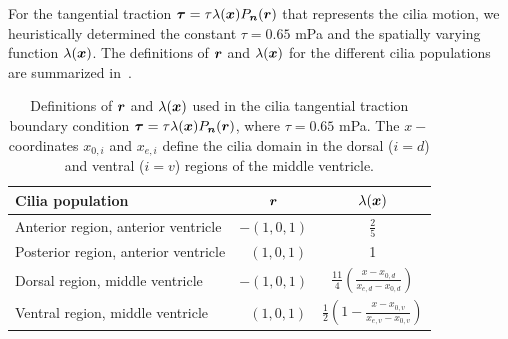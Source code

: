 \documentclass{WileyMSP-template}
\begin{document}
For the tangential traction $\bm{\tau} = \tau\lambda(\bm{x}) P_{\bm{n}}(\bm{r})$ that represents the cilia
motion, we heuristically determined the constant $\tau= 0.65$ mPa
and the spatially varying function $\lambda(\bm{x})$. The definitions of $\bm{r}$ and $\lambda(\bm{x})$
for the different cilia populations are summarized in~.
\begingroup
\setlength{\tabcolsep}{20pt}
\renewcommand{\arraystretch}{1.5}
\begin{table}[H]
    \centering
    \caption{Definitions of $\bm{r}$ and $\lambda(\bm{x})$ used in the cilia tangential 
    traction boundary condition $\bm{\tau} = \tau\lambda(\bm{x})P_{\bm{n}}(\bm{r})$,
    where $\tau=0.65$ mPa. The $x-$coordinates $x_{0, i}$ and $x_{e, i}$ define 
    the cilia domain in the dorsal ($i=d$) and ventral ($i=v$) regions of 
    the middle ventricle.}\label{tab:r_vector_and_lambda_function}
    \begin{tabular}{lcc}
        \toprule
        Cilia population & $\bm{r}$ & $\lambda(\bm{x})$ \\
        \midrule 
        Anterior region, anterior ventricle 
        & $-(1, 0, 1)$ & $\frac{2}{5}$ \\
        Posterior region, anterior ventricle
        & $\ \ \ (1, 0, 1)$ & 1 \\
        Dorsal region, middle ventricle     
        & $-(1, 0, 1)$
        & $\frac{11}{4}\left(\frac{x-x_{0, d}}{x_{e, d} - x_{0, d}}\right)$\\
        Ventral region, middle ventricle    
        & $\ \ \ (1, 0, 1)$
        & $\frac{1}{2}\left(1 - \frac{x-x_{0, v}}{x_{e, v} - x_{0, v}}\right)$ \\
        \bottomrule
    \end{tabular}
\end{table}
\endgroup
\end{document}
